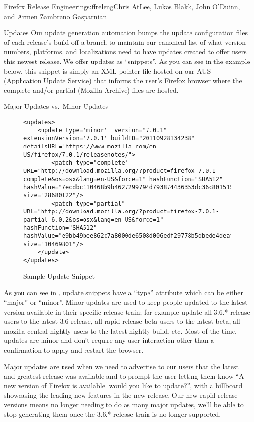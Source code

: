\begin{aosachapter}{Firefox Release Engineering}{s:ffreleng}{Chris AtLee, Lukas Blakk, John O'Duinn, and Armen Zambrano Gasparnian}
\begin{aosasect1}{Updates}
Our update generation automation bumps the update configuration files
of each release's build off a branch to maintain our canonical list of
what version numbers, platforms, and localizations need to have
updates created to offer users this newest release. We offer updates
as ``snippets''. As you can see in the example below, this snippet is
simply an XML pointer file hosted on our AUS (Application Update
Service) that informs the user's Firefox browser where the complete
and/or partial  (Mozilla Archive) files are hosted.

\begin{aosasect2}{Major Updates vs.\ Minor Updates}

\begin{figure}  
\begin{verbatim}
<updates>
    <update type="minor"  version="7.0.1" extensionVersion="7.0.1" buildID="20110928134238" detailsURL="https://www.mozilla.com/en-US/firefox/7.0.1/releasenotes/">
        <patch type="complete" URL="http://download.mozilla.org/?product=firefox-7.0.1-complete&os=osx&lang=en-US&force=1" hashFunction="SHA512" hashValue="7ecdbc110468b9b4627299794d793874436353dc36c80151550b08830f9d8c5afd7940c51df9270d54e11fd99806f41368c0f88721fa17e01ea959144f473f9d" size="28680122"/>
        <patch type="partial" URL="http://download.mozilla.org/?product=firefox-7.0.1-partial-6.0.2&os=osx&lang=en-US&force=1" hashFunction="SHA512" hashValue="e9bb49bee862c7a8000de6508d006edf29778b5dbede4deaf3cfa05c22521fc775da126f5057621960d327615b5186b27d75a378b00981394716e93fc5cca11a" size="10469801"/>
    </update>
</updates>
\end{verbatim}
\caption{Sample Update Snippet}
\label{fig.ffreleng.snippet}
\end{figure}

As you can see in , update snippets
have a ``type'' attribute which can be either ``major'' or ``minor''.
Minor updates are used to keep people updated to the latest version
available in their specific release train; for example update all
3.6.* release users to the latest 3.6 release, all rapid-release beta
users to the latest beta, all mozilla-central nightly users to the
latest nightly build, etc.  Most of the time, updates are minor and
don't require any user interaction other than a confirmation to apply
and restart the browser.

Major updates are used when we need to advertise to our users that the
latest and greatest release was available and to prompt the user
letting them know ``A new version of Firefox is available, would you
like to update?'', with a billboard showcasing the leading new
features in the new release.  Our new rapid-release versions means no
longer needing to do as many major updates, we'll be able to stop
generating them once the 3.6.* release train is no longer supported.


\end{aosasect2}
\end{aosasect1}
\end{aosachapter}
